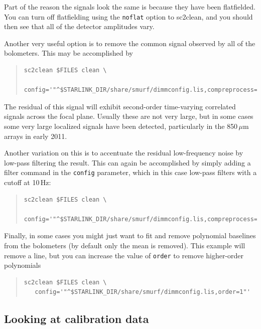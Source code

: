 \documentclass[twoside,11pt]{article}
\newcommand{\xref}[3]{#1}
\renewcommand{\_}{\texttt{\symbol{95}}}
\newenvironment{myquote}{\begin{quote}\begin{small}}{\end{small}\end{quote}}
\newcommand{\task}[1]{\textsf{#1}}
\newcommand{\clean}{\xref{\task{sc2clean}}{sun258}{SC2CLEAN}}
\begin{document}
Part of the reason the signals look the same is because they have been
flatfielded. You can turn off flatfielding using the \texttt{noflat}
option to \clean, and you should then see that all of the detector
amplitudes vary.

Another very useful option is to remove the common signal observed by
all of the bolometers. This may be accomplished by

\begin{myquote}
\begin{verbatim}
sc2clean $FILES clean \
   config='"^$STARLINK_DIR/share/smurf/dimmconfig.lis,compreprocess=1"'
\end{verbatim}
\end{myquote}

The residual of this signal will exhibit second-order time-varying
correlated signals across the focal plane. Usually these are not very
large, but in some cases some very large localized signals have been
detected, particularly in the 850\,$\mu$m arrays in early 2011.

Another variation on this is to accentuate the residual low-frequency
noise by low-pass filtering the result. This can again be accomplished
by simply adding a filter command in the \texttt{config} parameter,
which in this case low-pass filters with a cutoff at 10\,Hz:

\begin{myquote}
\begin{verbatim}
sc2clean $FILES clean \
   config='"^$STARLINK_DIR/share/smurf/dimmconfig.lis,compreprocess=1,filt_edgelow=10"'
\end{verbatim}
\end{myquote}

Finally, in some cases you might just want to fit and remove
polynomial baselines from the bolometers (by default only the mean is
removed). This example will remove a line, but you can increase the
value of \texttt{order} to remove higher-order polynomials

\begin{myquote}
\begin{verbatim}
sc2clean $FILES clean \
   config='"^$STARLINK_DIR/share/smurf/dimmconfig.lis,order=1"'
\end{verbatim}
\end{myquote}

\subsection{\label{caldata}Looking at calibration data}
\end{document}
